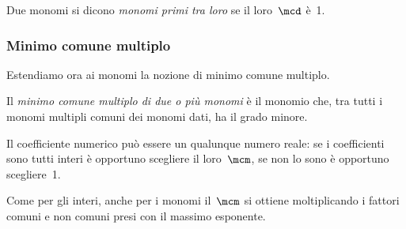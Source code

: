 \begin{definizione}
 Due monomi si dicono \emph{monomi primi tra loro} se il loro~\(\mcd\) è~1.
\end{definizione}

\subsubsection{Minimo comune multiplo}

Estendiamo ora ai monomi la nozione di minimo comune multiplo.

\begin{definizione}
 Il \emph{minimo comune multiplo di due o più monomi}
è il monomio che, tra tutti i monomi multipli comuni dei monomi dati,
ha il grado minore.
\end{definizione}

Il coefficiente numerico può essere un qualunque numero reale: se i
coefficienti sono tutti interi è opportuno scegliere il loro~\(\mcm\),
se non lo sono è opportuno scegliere~1.

Come per gli interi, anche per i monomi il~\(\mcm\) si ottiene moltiplicando 
i fattori comuni e non comuni presi con il massimo esponente.

